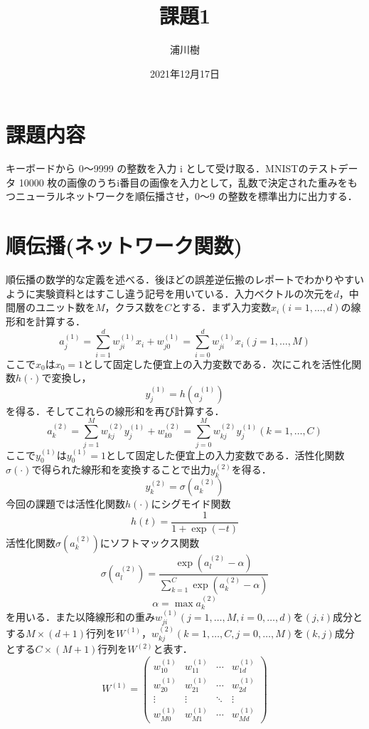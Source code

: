 \documentclass[uplatex]{jsarticle}
\begin{document}
    \title{課題1}
    \author{浦川樹}
    \date{2021年12月17日}
    \maketitle

    \section{課題内容}
    キーボードから 0～9999 の整数を入力 i として受け取る．MNISTのテストデータ 10000 枚の画像のうちi番目の画像を入力として，乱数で決定された重みをもつニューラルネットワークを順伝播させ，0〜9
    の整数を標準出力に出力する．

    \section{順伝播(ネットワーク関数)}
    \label{sec:f_prop}
    順伝播の数学的な定義を述べる．後ほどの誤差逆伝搬のレポートでわかりやすいように実験資料とはすこし違う記号を用いている．入力ベクトルの次元を$d$，中間層のユニット数を$M$，クラス数を$C$とする．まず入力変数$x_i (i = 1, \ldots ,d)$の線形和を計算する．
    $$ a_j^{(1)} = \sum_{i = 1}^d w_{ji}^{(1)} x_i + w_{j0}^{(1)} = \sum_{i = 0}^d w_{ji}^{(1)} x_i (j = 1, \ldots ,M) $$
    ここで$x_0$は$x_0 = 1$として固定した便宜上の入力変数である．次にこれを活性化関数$h(\cdot)$で変換し，
    $$ y_j^{(1)} = h(a_j^{(1)}) $$
    を得る．そしてこれらの線形和を再び計算する．
    $$ a_k^{(2)} = \sum_{j = 1}^M w_{kj}^{(2)} y_j^{(1)} + w_{k0}^{(2)} = \sum_{j = 0}^M w_{kj}^{(2)} y_j^{(1)} (k = 1, \ldots ,C)$$
    ここで$y_0^{(1)}$は$y_0^{(1)} = 1$として固定した便宜上の入力変数である．活性化関数$\sigma(\cdot)$で得られた線形和を変換することで出力$y_k^{(2)}$を得る．
    $$ y_k^{(2)} = \sigma(a_k^{(2)}) $$
    今回の課題では活性化関数$h(\cdot)$にシグモイド関数
    $$ h(t) = \frac{1}{1 + \exp(-t)} $$
    活性化関数$\sigma(a_k^{(2)})$にソフトマックス関数
    $$ \sigma(a_l^{(2)}) = \frac{\exp(a_l^{(2)} - \alpha)}{\sum_{k = 1}^C \exp(a_k^{(2)} - \alpha)} $$
    $$ \alpha = \max a_k^{(2)}$$
    を用いる．また以降線形和の重み$w_{ji}^{(1)}(j = 1, \ldots ,M, i = 0, \ldots ,d)$を$(j,i)$成分とする$M \times (d + 1)$行列を$W^{(1)}$，$w_{kj}^{(2)}(k = 1, \ldots ,C, j = 0, \ldots ,M)$を$(k,j)$成分とする$C \times (M + 1)$行列を$W^{(2)}$と表す．
    $$ W^{(1)} = 
    \begin{pmatrix}
        w_{10}^{(1)} & w_{11}^{(1)} & \cdots & w_{1d}^{(1)} \\
        w_{20}^{(1)} & w_{21}^{(1)} & \cdots & w_{2d}^{(1)} \\
        \vdots & \vdots & \ddots & \vdots \\
        w_{M0}^{(1)} & w_{M1}^{(1)} & \cdots & w_{Md}^{(1)} 
    \end{pmatrix}
    $$
\end{document}
